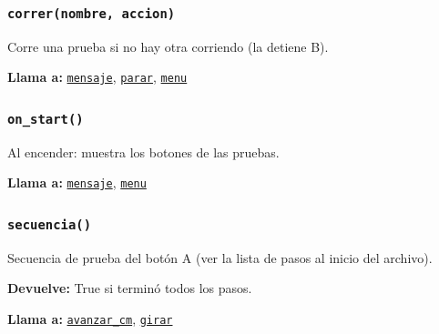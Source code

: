 
\subsubsection{\texttt{correr(nombre, accion)}}\label{fn:funciones_rover:correr}
\noindent Corre una prueba si no hay otra corriendo (la detiene B).

\par{}\par\smallskip
\noindent\textbf{Llama a:} \hyperref[fn:funciones_rover:mensaje]{\texttt{mensaje}}, \hyperref[fn:funciones_rover:parar]{\texttt{parar}}, \hyperref[fn:funciones_rover:menu]{\texttt{menu}}\par

\subsubsection{\texttt{on\_\allowbreak{}start()}}\label{fn:funciones_rover:on-start}
\noindent Al encender: muestra los botones de las pruebas.

\noindent\textbf{Llama a:} \hyperref[fn:funciones_rover:mensaje]{\texttt{mensaje}}, \hyperref[fn:funciones_rover:menu]{\texttt{menu}}\par

\subsubsection{\texttt{secuencia()}}\label{fn:funciones_rover:secuencia}
\noindent Secuencia de prueba del botón A (ver la lista de pasos al inicio del archivo).

\noindent\textbf{Devuelve:} True si terminó todos los pasos.\par
\noindent\textbf{Llama a:} \hyperref[fn:funciones_rover:avanzar-cm]{\texttt{avanzar\_\allowbreak{}cm}}, \hyperref[fn:funciones_rover:girar]{\texttt{girar}}\par

